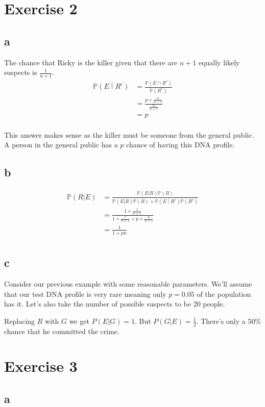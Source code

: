 \documentclass{article}
\newcommand{\prob}{\mathbb{P}}
\begin{document}
\section{Exercise 2}
\subsection{a}
The chance that Ricky is the killer given that there are $n+1$ equally likely
suspects is $\frac{1}{n+1}$.
\begin{align*}
    \prob \left(E \middle| R^c\right)
    &= \frac{\prob \left(E \cap R^c\right)}{\prob \left(R^c\right)} \\
    &= \frac{p \times \frac{n}{n+1}}{\frac{n}{n+1}} \\
    &= p \\
\end{align*}

This answer makes sense as the killer must be someone from the general public.
A person in the general public has a $p$ chance of having this DNA profile.

\subsection{b}
\begin{align*}
    \prob(R|E)
    &= \frac{\prob(E|R) \prob(R)}{\prob(E|R)\prob(R)
        + \prob\left(E\middle|R^c\right)\prob\left(R^c\right)} \\
    &= \frac{1 \times \frac{1}{n+1}}{1 \times \frac{1}{n+1} + p \times \frac{n}{n+1}} \\
    &= \frac{1}{1 + pn} \\
\end{align*}

\subsection{c}
Consider our previous example with some reasonable parameters. We'll assume
that our test DNA profile is very rare meaning only $p=0.05$ of the population
has it. Let's also take the number of possible suspects to be 20 people.

Replacing $R$ with $G$ we get $P(E|G) = 1$. But $P(G|E) = \frac{1}{2}$.
There's only a $50\%$ chance that he committed the crime.

\section{Exercise 3}
\subsection{a}
\end{document}
